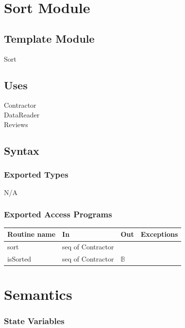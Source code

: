\documentclass[12pt]{scrartcl}
\begin{document}
\newpage

\section {Sort Module}

\subsection{Template Module}

Sort

\subsection {Uses}

Contractor \\
DataReader \\
Reviews 

\subsection {Syntax}

\subsubsection {Exported Types}

N/A

\subsubsection {Exported Access Programs}

\begin{tabular}{| l | l | l | l |}
\hline
\textbf{Routine name} & \textbf{In} & \textbf{Out} & \textbf{Exceptions}\\
\hline
sort & seq of Contractor &  & \\
\hline
isSorted & seq of Contractor & $\mathbb{B}$ & \\
\hline

\end{tabular}

\section {Semantics}

\subsubsection {State Variables}
\end{document}
